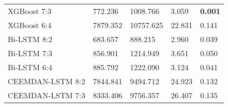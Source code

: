 \documentclass{ieeeojies}
\begin{document}
\begin{table}[H]
\begin{tabular}{lp{1.1cm}p{1.2cm}p{1cm}p{0.9cm}}
\cellcolor{firstcolcolor} XGBoost  7:3 & 772.236 & 1008.766 & 3.059 & \textbf{0.001} \\
\cellcolor{firstcolcolor} XGBoost  6:4 & 7879.352 & 10757.625 & 22.831 & 0.141 \\
\cellcolor{firstcolcolor} Bi-LSTM  8:2 & 683.657 & 888.215 & 2.960 & 0.039 \\
\cellcolor{firstcolcolor} Bi-LSTM 7:3 & 856.901 & 1214.949 & 3.651 & 0.050 \\
\cellcolor{firstcolcolor} Bi-LSTM 6:4 & 885.792 & 1222.090 & 3.124 & 0.041 \\
\cellcolor{firstcolcolor} CEEMDAN-LSTM 8:2 & 7844.841 & 9494.712 & 24.923 & 0.132\\
\cellcolor{firstcolcolor} CEEMDAN-LSTM 7:3 & 8333.406 & 9756.357 & 26.407 & 0.135\\
\hline
\end{tabular}
\end{table}
\end{document}
